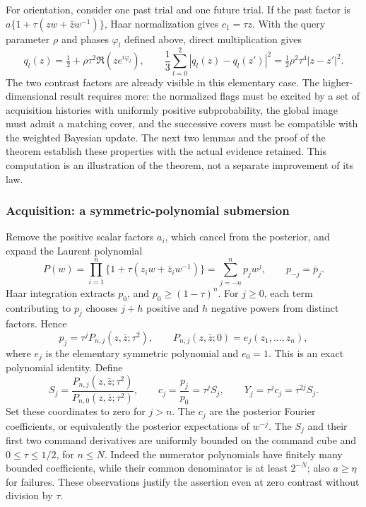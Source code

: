 For orientation, consider one past trial and one future trial. If the
past factor is $a\{1+\tau(zw+\bar z w^{-1})\}$, Haar normalization
gives $c_1=\tau z$. With the query parameter $\rho$ and phases
$\varphi_l$ defined above, direct multiplication gives
\[
 q_l(z)=\tfrac12+\rho\tau^2\Re(ze^{i\varphi_l}),\qquad
 \frac13\sum_{l=0}^{2}|q_l(z)-q_l(z')|^2
       =\tfrac12\rho^2\tau^4|z-z'|^2.
\]
The two contrast factors are already visible in this elementary case.
The higher-dimensional result requires more: the normalized flags must
be excited by a set of acquisition histories with uniformly positive
subprobability, the global image must admit a matching cover, and the
successive covers must be compatible with the weighted Bayesian update.
The next two lemmas and the proof of the theorem establish these
properties with the actual evidence retained. This computation is an
illustration of the theorem, not a separate improvement of its law.


\subsubsection{Acquisition: a symmetric-polynomial submersion}
Remove the positive scalar factors $a_i$, which cancel from the posterior,
and expand the Laurent polynomial
\begin{equation}\label{eq:circle-laurent}
 P(w)=\prod_{i=1}^n\{1+\tau(z_iw+\bar z_iw^{-1})\}
     =\sum_{j=-n}^{n}p_jw^j,
 \qquad p_{-j}=\bar p_j.
\end{equation}
Haar integration extracts $p_0$, and $p_0\ge(1-\tau)^n$.
For $j\ge0$, each term contributing to $p_j$ chooses $j+h$ positive
and $h$ negative powers from distinct factors. Hence
\begin{equation}\label{eq:circle-coefficient-factorization}
 p_j=\tau^j P_{n,j}(z,\bar z;\tau^2),\qquad
 P_{n,j}(z,\bar z;0)=e_j(z_1,\ldots,z_n),
\end{equation}
where $e_j$ is the elementary symmetric polynomial and $e_0=1$.
This is an exact polynomial identity. Define
\[
 S_j=\frac{P_{n,j}(z,\bar z;\tau^2)}{P_{n,0}(z,\bar z;\tau^2)},
 \qquad c_j=\frac{p_j}{p_0}=\tau^jS_j,
 \qquad Y_j=\tau^jc_j=\tau^{2j}S_j.
\]
Set these coordinates to zero for $j>n$. The $c_j$ are the posterior
Fourier coefficients, or equivalently the posterior expectations of
$w^{-j}$. The $S_j$ and their first two command derivatives are uniformly
bounded on the command cube and $0\le\tau\le1/2$, for $n\le N$.
Indeed the numerator polynomials have finitely many bounded coefficients,
while their common denominator is at least $2^{-N}$; also $a\ge\eta$
for failures. These observations justify the assertion even at zero
contrast without division by $\tau$.

